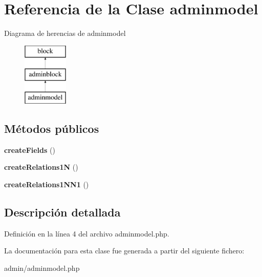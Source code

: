 \hypertarget{classadminmodel}{\section{\-Referencia de la \-Clase adminmodel}
\label{classadminmodel}
}
\-Diagrama de herencias de adminmodel\begin{figure}[H]
\begin{center}
\leavevmode
\includegraphics[height=3.000000cm]{classadminmodel}
\end{center}
\end{figure}
\subsection*{\-Métodos públicos}
\begin{DoxyCompactItemize}
\item 
\hypertarget{classadminmodel_a719d03fccd7778a3c34d485544ba60e3}{{\bfseries create\-Fields} ()}\label{classadminmodel_a719d03fccd7778a3c34d485544ba60e3}

\item 
\hypertarget{classadminmodel_ae6097b00d7e11027b2de92b9da9eaa92}{{\bfseries create\-Relations1\-N} ()}\label{classadminmodel_ae6097b00d7e11027b2de92b9da9eaa92}

\item 
\hypertarget{classadminmodel_afb87584c89afa1378abe6c72c54591a3}{{\bfseries create\-Relations1\-N\-N1} ()}\label{classadminmodel_afb87584c89afa1378abe6c72c54591a3}

\end{DoxyCompactItemize}


\subsection{\-Descripción detallada}


\-Definición en la línea 4 del archivo adminmodel.\-php.



\-La documentación para esta clase fue generada a partir del siguiente fichero\-:\begin{DoxyCompactItemize}
\item 
admin/adminmodel.\-php\end{DoxyCompactItemize}
